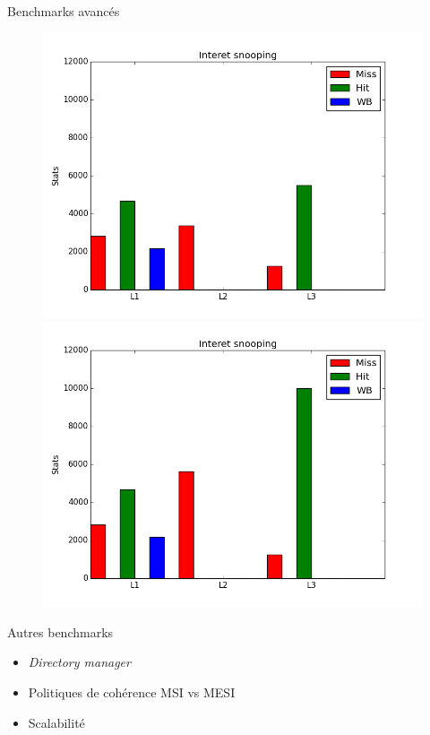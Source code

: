\begin{frame}{Benchmarks avanc\'es}
\begin{figure}[H]
   \begin{minipage}[l]{.46\textwidth}
     \includegraphics[scale=0.22]{images/stats_falsesharing_snooping.png}
   \end{minipage} \hfill
   \begin{minipage}[r]{.46\textwidth}
     \includegraphics[scale=0.22]{images/stats_falsesharing_no_snooping.png}
   \end{minipage}
\end{figure}
  \begin{block}{Autres benchmarks}
    \begin{itemize}
      \item \emph{Directory manager}
      \item Politiques de coh\'erence MSI vs MESI
      \item Scalabilit\'e
    \end{itemize}
  \end{block}
\end{frame}

